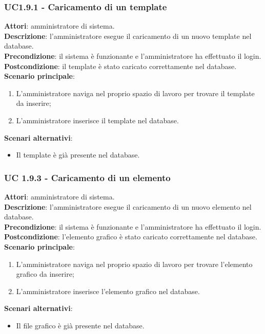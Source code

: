\subsubsection{UC1.9.1 - Caricamento di un template}{
	\label{uc1.9.1}
	\textbf{Attori}: amministratore di sistema. \\
	\textbf{Descrizione}: l'amministratore esegue il caricamento di un nuovo template nel database. \\
	\textbf{Precondizione}: il sistema  è funzionante e l'amministratore ha effettuato il login.	\\
	\textbf{Postcondizione}: il template è stato caricato correttamente nel database.	\\
	\textbf{Scenario principale}:
	\begin{enumerate}
		\item L'amministratore naviga nel proprio spazio di lavoro  per trovare il template da inserire;
		\item L'amministratore inserisce il template nel database.
	\end{enumerate}
	\textbf{Scenari alternativi}:
	\begin{itemize}
		\item Il template è già presente nel database.
	\end{itemize}
	}
\subsubsection{UC 1.9.3 - Caricamento di un elemento}{
	\label{uc1.9.3}
	\textbf{Attori}: amministratore di sistema. \\
	\textbf{Descrizione}: l'amministratore esegue il caricamento di un nuovo elemento nel database. \\
	\textbf{Precondizione}: il sistema  è funzionante e l'amministratore ha effettuato il login.	\\
	\textbf{Postcondizione}: l'elemento grafico è stato caricato correttamente nel database.	\\
	\textbf{Scenario principale}:
	\begin{enumerate}
		\item L'amministratore naviga nel proprio spazio di lavoro per trovare l'elemento grafico da inserire;
		\item L'amministratore inserisce l'elemento grafico nel database.
	\end{enumerate}
	\textbf{Scenari alternativi}:
	\begin{itemize}
		\item Il file grafico è già presente nel database.
	\end{itemize}
	}

